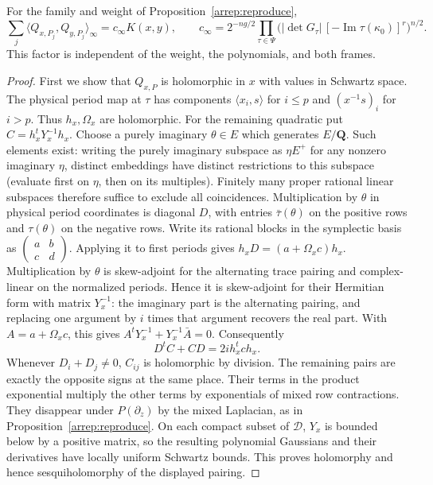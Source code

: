 \begin{lemma}\label{dg:gaussian}
For the family and weight of Proposition~\ref{arrep:reproduce},
\[
 \sum_j\langle Q_{x,P_j},Q_{y,P_j}\rangle_\infty
 =c_\infty K(x,y),\qquad
 c_\infty=2^{-ng/2}\prod_{\tau\in\Psi}
     \bigl(|\det G_\tau|\,[-\operatorname{Im}\tau(\kappa_0)]^r
                                                        \bigr)^{n/2}.
\]
This factor is independent of the weight, the polynomials, and both
frames.
\end{lemma}
\begin{proof}
First we show that $Q_{x,P}$ is holomorphic in $x$ with values in
Schwartz space. The physical period map at $\tau$ has components
$\langle x_i,s\rangle$ for $i\le p$ and $(x^{-1}s)_i$ for $i>p$.
Thus $h_x,\Omega_x$ are holomorphic. For the remaining quadratic put
$C=h_x^tY_x^{-1}h_x$. Choose a purely imaginary $\theta\in E$
which generates $E/\mathbf Q$. Such elements exist: writing the
purely imaginary subspace as $\eta E^+$ for any nonzero imaginary
$\eta$, distinct embeddings have distinct restrictions to this
subspace (evaluate first on $\eta$, then on its multiples).
Finitely many proper rational linear subspaces therefore suffice to
exclude all coincidences. Multiplication by $\theta$ in physical
period coordinates is diagonal $D$, with entries $\bar\tau(\theta)$
on the positive rows and $\tau(\theta)$ on the negative rows.
Write its rational blocks in the symplectic basis as
$\left(\begin{smallmatrix}a&b\\ c&d\end{smallmatrix}\right)$.
Applying it to first periods gives $h_xD=(a+\Omega_xc)h_x$.
Multiplication by $\theta$ is skew-adjoint for the alternating trace
pairing and complex-linear on the normalized periods. Hence it is
skew-adjoint for their Hermitian form with matrix $Y_x^{-1}$: the
imaginary part is the alternating pairing, and replacing one argument
by $i$ times that argument recovers the real part. With $A=a+\Omega_xc$,
this gives $A^tY_x^{-1}+Y_x^{-1}\bar A=0$. Consequently
\[
                  D^t C+C D=2i h_x^t c h_x .
\]
Whenever $D_i+D_j\ne0$, $C_{ij}$ is holomorphic by division.
The remaining pairs are exactly the opposite signs at the same
place. Their terms in the product exponential multiply the other
terms by exponentials of mixed row contractions. They disappear
under $P(\partial_z)$ by the mixed Laplacian, as in
Proposition~\ref{arrep:reproduce}. On each compact subset of
$\mathcal D$, $Y_x$ is bounded below by a positive matrix, so the
resulting polynomial Gaussians and their derivatives have locally
uniform Schwartz bounds. This proves holomorphy and hence
sesquiholomorphy of the displayed pairing.


\end{proof}
